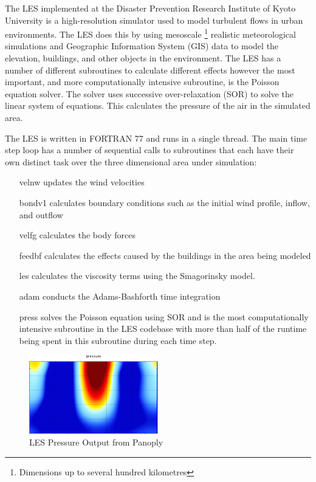 The LES implemented at the Disaster Prevention Research Institute of Kyoto
University is a high-resolution simulator used to model turbulent flows in urban
environments. The LES does this by using mesoscale \footnote{Dimensions up to
several hundred kilometres} realistic meteorological simulations and Geographic
Information System (GIS) data to model the elevation, buildings, and other
objects in the environment. The LES has a number of different subroutines to
calculate different effects however the most important, and more computationally
intensive subroutine, is the Poisson equation solver. The solver uses successive
over-relaxation (SOR) to solve the linear system of equations. This calculates
the pressure of the air in the simulated area.

The LES is written in FORTRAN 77 and runs in a single thread. The main time step
loop has a number of sequential calls to subroutines that each have their own
distinct task over the three dimensional area under simulation:

\begin{itemize}[noitemsep,nolistsep]

    \item[velnw] updates the wind velocities

    \item[bondv1] calculates boundary conditions such as the initial wind
    profile, inflow, and outflow

    \item[velfg] calculates the body forces

    \item[feedbf] calculates the effects caused by the buildings in the area
    being modeled

    \item[les] calculates the viscosity terms using the Smagorinsky model.

    \item[adam] conducts the Adams-Bashforth time integration

    \item[press] solves the Poisson equation using SOR and is the most
    computationally intensive subroutine in the LES codebase with more than half
    of the runtime being spent in this subroutine during each time step.

\end{itemize}

\begin{figure}
    \includegraphics[width=0.5\textwidth]{graphs/pressure_in_LES_output_p.png}
    \caption{LES Pressure Output from Panoply}
    \label{fig:lespressure}
\end{figure}

